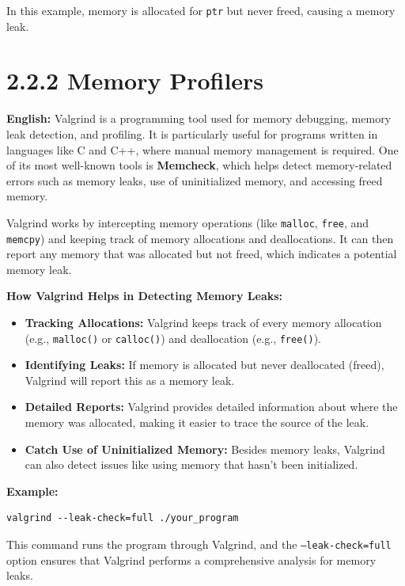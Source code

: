 \documentclass{article}
\begin{document}
In this example, memory is allocated for \texttt{ptr} but never freed, causing a memory leak.








\section*{2.2.2 Memory Profilers}

\textbf{English:} 
Valgrind is a programming tool used for memory debugging, memory leak detection, and profiling. It is particularly useful for programs written in languages like C and C++, where manual memory management is required. One of its most well-known tools is \textbf{Memcheck}, which helps detect memory-related errors such as memory leaks, use of uninitialized memory, and accessing freed memory.

Valgrind works by intercepting memory operations (like \texttt{malloc}, \texttt{free}, and \texttt{memcpy}) and keeping track of memory allocations and deallocations. It can then report any memory that was allocated but not freed, which indicates a potential memory leak.

\textbf{How Valgrind Helps in Detecting Memory Leaks:}
\begin{itemize}
    \item \textbf{Tracking Allocations:} Valgrind keeps track of every memory allocation (e.g., \texttt{malloc()} or \texttt{calloc()}) and deallocation (e.g., \texttt{free()}).
    \item \textbf{Identifying Leaks:} If memory is allocated but never deallocated (freed), Valgrind will report this as a memory leak.
    \item \textbf{Detailed Reports:} Valgrind provides detailed information about where the memory was allocated, making it easier to trace the source of the leak.
    \item \textbf{Catch Use of Uninitialized Memory:} Besides memory leaks, Valgrind can also detect issues like using memory that hasn't been initialized.
\end{itemize}

\textbf{Example:}
\begin{verbatim}
valgrind --leak-check=full ./your_program
\end{verbatim}
This command runs the program through Valgrind, and the \texttt{--leak-check=full} option ensures that Valgrind performs a comprehensive analysis for memory leaks.
\end{document}
